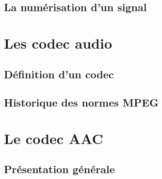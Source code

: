 \documentclass{article}
\begin{document}


    \subsection{La numérisation d'un signal}


    \section{Les codec audio}
    \subsection{Définition d'un codec}
    \subsection{Historique des normes MPEG}







    \section{Le codec AAC}
    \subsection{Présentation générale}
\end{document}
